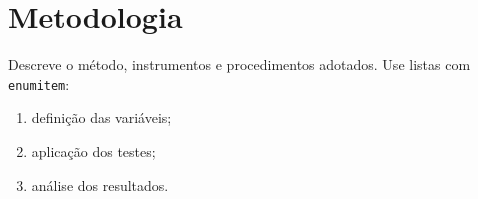 \section{Metodologia}\label{sec:metodologia}

Descreve o método, instrumentos e procedimentos adotados.  
Use listas com \texttt{enumitem}:
\begin{enumerate}[label=\alph*), itemsep=0pt, topsep=0pt, parsep=0pt, partopsep=0pt]
  \item definição das variáveis;
  \item aplicação dos testes;
  \item análise dos resultados.
\end{enumerate}
